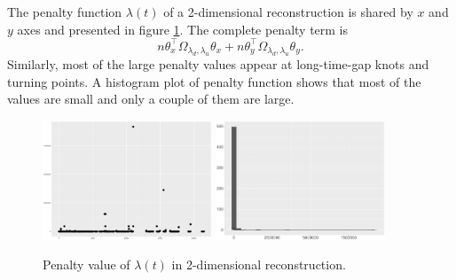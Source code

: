 The penalty function $\lambda(t)$ of a 2-dimensional reconstruction is shared by $x$ and $y$ axes and presented in figure \ref{2dpenalty}. The complete penalty term is 
\begin{equation*}
n\theta_x^\top\Omega_{\lambda_d,\lambda_u}\theta_x + n\theta_y^\top\Omega_{\lambda_d,\lambda_u}\theta_y.
\end{equation*}
Similarly, most of the large penalty values appear at long-time-gap knots and turning points. A histogram plot of penalty function shows that most of the values are small and only a couple of them are large. 
\begin{figure}
  \centering
    \includegraphics[width=0.45\textwidth]{Chapters/02TractorSplineTheory/plot/ggplot/ggRealdataXYPenaltyLine.pdf}
    \includegraphics[width=0.45\textwidth]{Chapters/02TractorSplineTheory/plot/ggplot/ggRealdataXYPenaltyHist.pdf} 
  \caption{Penalty value of $\lambda(t)$ in 2-dimensional reconstruction.}\label{2dpenalty}
\end{figure}


